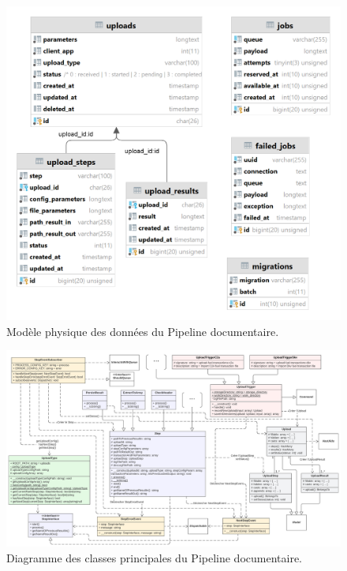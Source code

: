 \begin{figure}[ht]
    \centering
    \includegraphics[width=\textwidth]{img/sdf_db}
    \caption{Modèle physique des données du Pipeline documentaire.}
    \label{fig:pmd}
\end{figure}

\begin{figure}
    \centering
    \includegraphics[width=\textwidth]{img/class-diagram-2}
    \caption{Diagramme des classes principales du Pipeline documentaire.}
    \label{fig:class-diagram}
\end{figure}